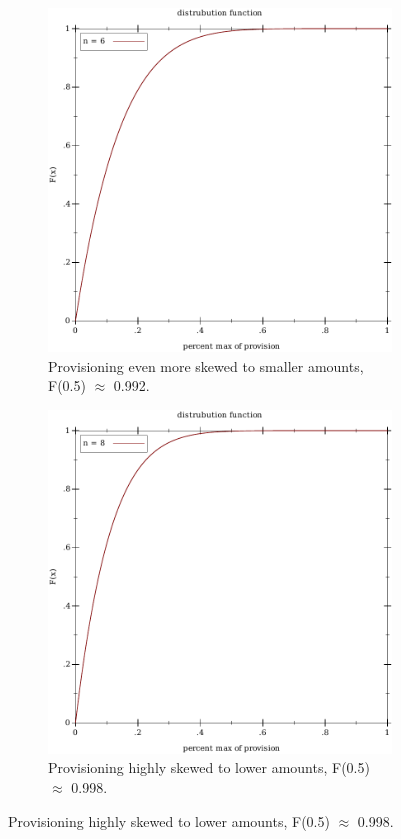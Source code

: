\documentclass[12pt]{article} %
\begin{document}
\begin{figure}[h!]
        \vspace{1cm}
        \begin{subfigure}[b]{0.3\textwidth}
            \centering
            \includegraphics[trim=6cm 0cm 4cm 0cm, scale=0.5]{plots/distribution_out_6.pdf}
            \caption{Provisioning even more skewed to smaller amounts, F(0.5) \(\approx\) 0.992.}
            \label{fig:third}
        \end{subfigure}
       \qquad \qquad  \qquad 
        \begin{subfigure}[b]{0.3\textwidth}
            \centering
            \includegraphics[trim=4cm 0cm 6cm 0cm, scale=0.5]{plots/distribution_out_8.pdf}
            \caption{Provisioning highly skewed to lower amounts, F(0.5) \(\approx\) 0.998.}
            \label{fig:fourth}
        \end{subfigure}


\end{figure}
\end{document}
